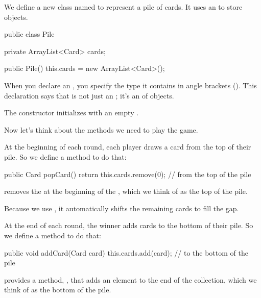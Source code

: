 
We define a new class named  to represent a pile of cards.
It uses an  to store  objects.

\begin{code}
public class Pile {
    private ArrayList<Card> cards;

    public Pile() {
        this.cards = new ArrayList<Card>();
    }
}
\end{code}


When you declare an , you specify the type it contains in angle brackets (\java{<>}).
This declaration says that  is not just an ; it's an  of  objects.

The constructor initializes  with an empty .


Now let's think about the methods we need to play the game.

At the beginning of each round, each player draws a card from the top of their pile.
So we define a method to do that:


\begin{code}
public Card popCard() {
    return this.cards.remove(0);  // from the top of the pile
}
\end{code}

 removes the  at the beginning of the , which we think of as the top of the pile.

Because we use , it automatically shifts the remaining cards to fill the gap.

At the end of each round, the winner adds cards to the bottom of their pile.
So we define a method to do that:

\begin{code}
public void addCard(Card card) {
    this.cards.add(card);        // to the bottom of the pile
}
\end{code}

 provides a method, , that adds an element to the end of the collection, which we think of as the bottom of the pile.

